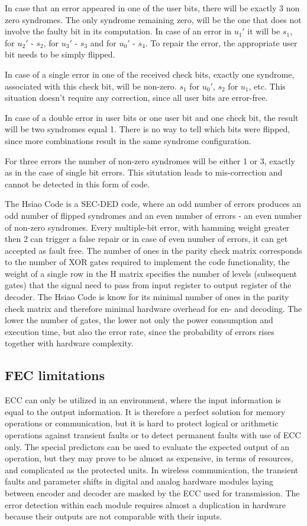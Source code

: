 In case that an error appeared in one of the user bits, there will be exactly 3 non zero syndromes. The only syndrome remaining zero, will be the one that does not involve the faulty bit in its computation. In case of an error in $u_1'$ it will be $s_1$, for $u_2'$ - $s_2$, for $u_3'$ - $s_3$ and for $u_0'$ - $s_4$. To repair the error, the appropriate user bit needs to be simply flipped.

In case of a single error in one of the received check bits, exactly one syndrome, associated with this check bit, will be non-zero. $s_1$ for $u_0'$, $s_2$ for $u_1$, etc. This situation doesn't require any correction, since all user bits are error-free. 

In case of a double error in user bits or one user bit and one check bit, the result will be two syndromes equal 1. There is no way to tell which bits were flipped, since more combinations result in the same syndrome configuration.

For three errors the number of non-zero syndromes will be either 1 or 3, exactly as in the case of single bit errors. This situtation leads to mis-correction and cannot be detected in this form of code.

The Hsiao Code is a SEC-DED code, where an odd number of errors produces an odd number of flipped syndromes and an even number of errors - an even number of non-zero syndromes. Every multiple-bit error, with hamming weight greater then 2 can trigger a false repair or in case of even number of errors, it can get accepted as fault free. The number of ones in the parity check matrix corresponds to the number of XOR gates required to implement the code functionality, the weight of a single row in the H matrix specifies the number of levels (subsequent gates) that the signal need to pass from input register to output register of the decoder. The Hsiao Code is know for its minimal number of ones in the parity check matrix and therefore minimal hardware overhead for en- and decoding. The lower the number of gates, the lower not only the power consumption and execution time, but also the error rate, since the probability of errors rises together with hardware complexity.

\subsection{FEC limitations}\label{sub:limits}
ECC can only be utilized in an environment, where the input information is equal to the output information. It is therefore a perfect solution for memory operations or communication, but it is hard to protect logical or arithmetic operations against transient faults or to detect permanent faults with use of ECC only. The special predictors can be used to evaluate the expected output of an operation, but they may prove to be almost as expensive, in terms of resources, and complicated as the protected units. In wireless communication, the transient faults and parameter shifts in digital and analog hardware modules laying between encoder and decoder are masked by the ECC used for transmission. The error detection within each module requires almost a duplication in hardware because their outputs are not comparable with their inputs.

